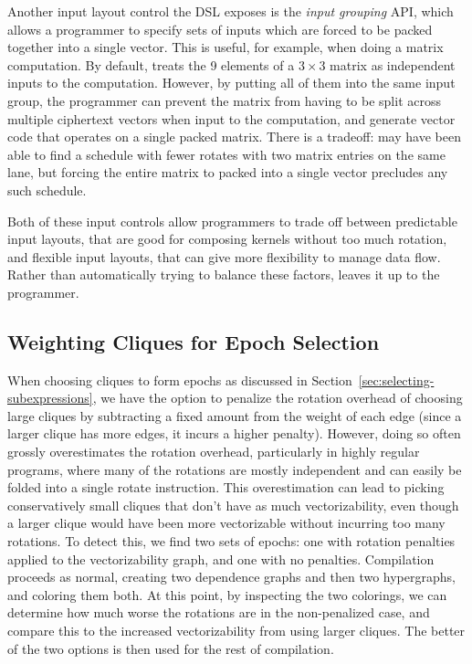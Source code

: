 Another input layout control the \system DSL exposes is the {\em input grouping} API, which allows a programmer to specify sets of inputs which are forced to be packed together into a single vector.
This is useful, for example, when doing a matrix computation.
By default, \system treats the 9 elements of a $3 \times 3$ matrix as independent inputs to the computation.
However, by putting all of them into the same input group, the programmer can prevent the matrix from having to be split across multiple ciphertext vectors when input to the computation, and generate vector code that operates on a single packed matrix. 
There is a tradeoff: \system may have been able to find a schedule with fewer rotates with two matrix entries on the same lane, but forcing the entire matrix to packed into a single vector precludes any such schedule.

Both of these input controls allow programmers to trade off between predictable input layouts, that are good for composing kernels without too much rotation, and flexible input layouts, that can give \system more flexibility to manage data flow. Rather than automatically trying to balance these factors, \system leaves it up to the programmer.



\subsection{Weighting Cliques for Epoch Selection}\label{sec:penalizing-rotates}%
When choosing cliques to form epochs as discussed in Section~\ref{sec:selecting-subexpressions}, we have the option to penalize the rotation overhead of choosing large cliques by subtracting a fixed amount from the weight of each edge (since a larger clique has more edges, it incurs a higher penalty).
However, doing so often grossly overestimates the rotation overhead, particularly in highly regular programs, where many of the rotations are mostly independent and can easily be folded into a single rotate instruction.
This overestimation can lead to picking conservatively small cliques that don't have as much vectorizability, even though a larger clique would have been more vectorizable without incurring too many rotations.
To detect this, we find two sets of epochs: one with rotation penalties applied to the vectorizability graph, and one with no penalties.
Compilation proceeds as normal, creating two dependence graphs and then two hypergraphs, and coloring them both.
At this point, by inspecting the two colorings, we can determine how much worse the rotations are in the non-penalized case, and compare this to the increased vectorizability from using larger cliques.
The better of the two options is then used for the rest of compilation.

